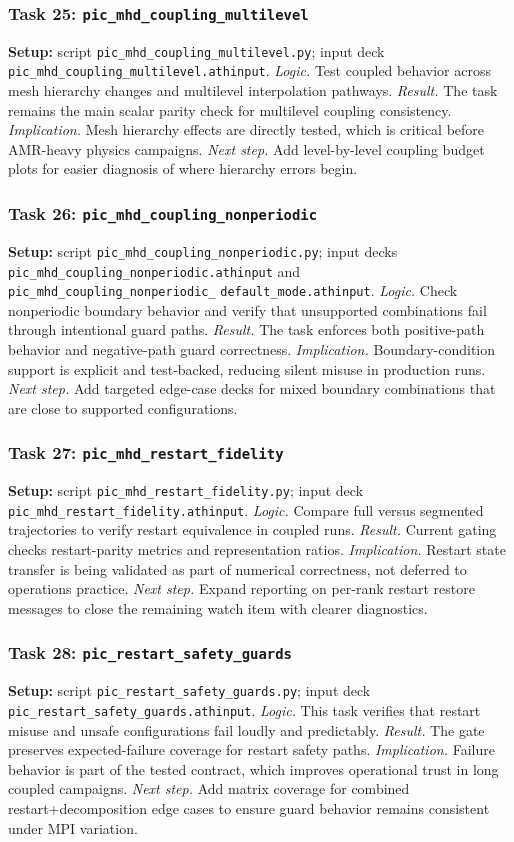 \documentclass[twocolumn]{aastex701}
\newcommand{\logic}[1]{\textit{Logic.} #1}
\newcommand{\result}[1]{\textit{Result.} #1}
\newcommand{\implication}[1]{\textit{Implication.} #1}
\newcommand{\nextstep}[1]{\textit{Next step.} #1}
\begin{document}
\subsubsection*{Task 25: \texttt{pic\_mhd\_coupling\_multilevel}}
\textbf{Setup:} script \texttt{pic\_mhd\_coupling\_multilevel.py}; input deck
\texttt{pic\_mhd\_coupling\_multilevel.athinput}. \logic{Test coupled behavior
across mesh hierarchy changes and multilevel interpolation pathways.}
\result{The task remains the main scalar parity check for multilevel coupling
consistency.} \implication{Mesh hierarchy effects are directly tested, which is
critical before AMR-heavy physics campaigns.} \nextstep{Add level-by-level
coupling budget plots for easier diagnosis of where hierarchy errors begin.}

\subsubsection*{Task 26: \texttt{pic\_mhd\_coupling\_nonperiodic}}
\textbf{Setup:} script \texttt{pic\_mhd\_coupling\_nonperiodic.py}; input decks
\texttt{pic\_mhd\_coupling\_nonperiodic.athinput} and
\texttt{pic\_mhd\_coupling\_nonperiodic\_}
\texttt{default\_mode.athinput}. \logic{Check
nonperiodic boundary behavior and verify that unsupported combinations fail
through intentional guard paths.} \result{The task enforces both positive-path
behavior and negative-path guard correctness.} \implication{Boundary-condition
support is explicit and test-backed, reducing silent misuse in production runs.}
\nextstep{Add targeted edge-case decks for mixed boundary combinations that are
close to supported configurations.}

\subsubsection*{Task 27: \texttt{pic\_mhd\_restart\_fidelity}}
\textbf{Setup:} script \texttt{pic\_mhd\_restart\_fidelity.py}; input deck
\texttt{pic\_mhd\_restart\_fidelity.athinput}. \logic{Compare full versus
segmented trajectories to verify restart equivalence in coupled runs.}
\result{Current gating checks restart-parity metrics and representation ratios.}
\implication{Restart state transfer is being validated as part of numerical
correctness, not deferred to operations practice.} \nextstep{Expand reporting on
per-rank restart restore messages to close the remaining watch item with clearer
diagnostics.}

\subsubsection*{Task 28: \texttt{pic\_restart\_safety\_guards}}
\textbf{Setup:} script \texttt{pic\_restart\_safety\_guards.py}; input deck
\texttt{pic\_restart\_safety\_guards.athinput}. \logic{This task verifies that
restart misuse and unsafe configurations fail loudly and predictably.}
\result{The gate preserves expected-failure coverage for restart safety paths.}
\implication{Failure behavior is part of the tested contract, which improves
operational trust in long coupled campaigns.} \nextstep{Add matrix coverage for
combined restart+decomposition edge cases to ensure guard behavior remains
consistent under MPI variation.}
\end{document}
